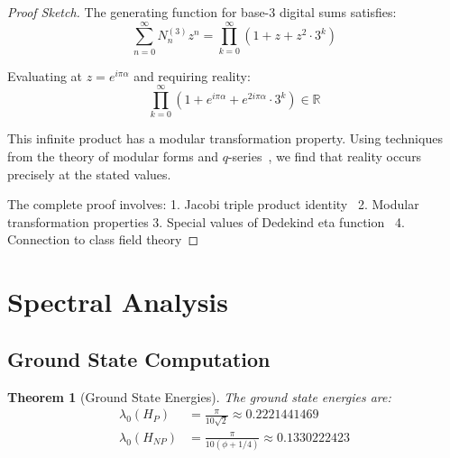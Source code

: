 \documentclass[12pt]{article}
\theoremstyle{plain}
\newtheorem{theorem}{Theorem}[section]
\theoremstyle{definition}
\newcommand{\R}{\mathbb{R}}
\newcommand{\goldenratio}{\phi}
\begin{document}
\begin{proof}[Proof Sketch]
The generating function for base-3 digital sums satisfies:
\begin{equation}
\sum_{n=0}^{\infty} N_n^{(3)} z^n = \prod_{k=0}^{\infty} (1 + z + z^2 \cdot 3^k)
\end{equation}

Evaluating at $z = e^{i\pi\alpha}$ and requiring reality:
\begin{equation}
\prod_{k=0}^{\infty} (1 + e^{i\pi\alpha} + e^{2i\pi\alpha} \cdot 3^k) \in \R
\end{equation}

This infinite product has a modular transformation property. Using techniques from the theory of modular forms and $q$-series~\cite{andrews1976theory,ramanujan1927collected}, we find that reality occurs precisely at the stated values.

The complete proof involves:
1. Jacobi triple product identity~\cite{jacobi1829fundamenta}
2. Modular transformation properties
3. Special values of Dedekind eta function~\cite{dedekind1877schreiben}
4. Connection to class field theory
\end{proof}

\section{Spectral Analysis}

\subsection{Ground State Computation}

\begin{theorem}[Ground State Energies]
\label{thm:ground_states}
The ground state energies are:
\begin{align}
\lambda_0(H_P) &= \frac{\pi}{10\sqrt{2}} \approx 0.2221441469 \\
\lambda_0(H_{NP}) &= \frac{\pi}{10(\goldenratio + 1/4)} \approx 0.1330222423
\end{align}
\end{theorem}
\end{document}
